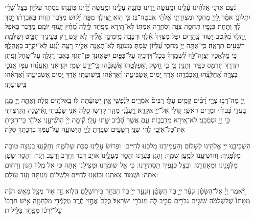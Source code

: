\documentclass[twoside, openany, parskip=half, 11pt]{book}
\begin{document}
נֹ֨עַם אֲדֹנָ֥י אֱלֹהֵ֗ינוּ עָ֫לֵ֥ינוּ וּמַֽעֲשֵׂ֣ה יָ֭דֵינוּ כּֽוֹנֲנָ֣ה עָלֵ֑ינוּ וּמַֽעֲשֵׂ֥ה יָ֝דֵ֗ינוּ כּֽוֹנֲנֵֽהוּ׃
 
 בְּסֵ֣תֶר עֶלְי֑וֹן בְּצֵ֥ל שַׁ֝דַּ֗י יִתְלוֹנָֽן׃
אֹמַ֗ר לַ֭יְיָ מַחְסִ֣י וּמְצֽוּדָתִ֑י אֱ֝לֹהַ֗י אֶבְטַח־בּֽוֹ׃ 
כִּ֤י ה֣וּא יַ֭צִּֽילְֿךָ מִפַּ֥ח יָ֝ק֗וּשׁ מִדֶּ֥בֶר הַוּֽוֹת׃ 
בְּאֶבְרָת֨וֹ יָ֣סֶךְ לָ֗ךְ וְתַ֣חַת כְּנָפָ֣יו תֶּחְסֶ֑ה צִנָּ֖ה וְסֹֽחֵרָ֣ה אֲמִתּֽוֹ׃ 
לֹֽא־תִ֭ירָא מִפַּ֣חַד לָ֑יְלָה מֵ֝חֵ֗ץ יָע֥וּף יוֹמָֽם׃ 
מִ֭דֶּֽבֶר בָּאֹ֣פֶל יַֽהֲלֹ֑ךְ מִ֝קֶּ֗טֶב יָשׁ֥וּד צָֽהֳרָֽיִם׃ 
יִפֹּ֤ל מִצִּדְּֿךָ֙ אֶ֗לֶף וּרְבָבָ֥ה מִֽימִינֶ֑ךָ אֵ֝לֶ֗יךָ לֹ֣א יִגָּֽשׁ׃ 
רַ֭ק בְּעֵינֶ֣יךָ תַבִּ֑יט וְשִׁלֻּמַ֖ת רְשָׁעִ֣ים תִּרְאֶֽה׃ 
כִּֽי־אַתָּ֣ה יְיָ֣ מַחְסִּ֑י עֶ֝לְי֗וֹן שַׂ֣מְתָּ מְעוֹנֶֽךָ׃ 
לֹֽא־תְאֻנֶּ֣ה אֵלֶ֣יךָ רָעָ֑ה וְנֶ֗֝גַע לֹֽא־יִקְרַ֥ב בְּאָֽהֳלֶֽךָ׃ 
כִּ֣י מַ֭לְאָכָיו יְצַוֶּה־לָּ֑ךְ לִ֝שְׁמָרְךָ֗ בְּכָל־דְּרָכֶֽיךָ׃ 
עַל־כַּפַּ֥יִם יִשָּׂא֑וּנְךָ פֶּן־תִּגֹּ֖ף בָּאֶ֣בֶן רַגְלֶֽךָ׃ 
עַל־שַׁ֣חַל וָפֶ֣תֶן תִּדְרֹ֑ךְ תִּרְמֹ֖ס כְּפִ֣יר וְתַנִּֽין׃ 
כִּ֤י בִ֣י חָ֭שַׁק וַֽאֲפַלְּֿטֵ֑הוּ אֲשַׂ֝גְּֿבֵ֗הוּ כִּֽי־יָדַ֥ע שְׁמִֽי׃ 
יִקְרָאֵ֨נִי וְֽאֶֽעֱנֵ֗הוּ עִמּ֣וֹ אָֽנֹכִ֣י בְצָרָ֑ה אֲ֝חַלְּֿצֵֽ֗הוּ וַֽאֲכַבְּֿדֵֽהוּ׃ 
אֹ֣רֶךְ יָ֭מִים ֖אַשְׂבִּיעֵ֑הוּ וְ֝אַרְאֵ֗הוּ בִּֽישֽׁוּעָתִֽי׃
אֹ֣רֶךְ יָ֭מִים ֖אַשְׂבִּיעֵ֑הוּ וְ֝אַרְאֵ֗הוּ בִּֽישֽׁוּעָתִֽי׃

 יְ֖יָ 
 מָה־רַבּ֣וּ צָרָ֑י רַ֝בִּ֗ים קָמִ֥ים עָלָֽי׃ רַבִּים֘ אֹֽמְֿרִ֢ים לְנַ֫פְשִׁ֥י אֵ֤ין יְשֽׁוּעָ֓תָה לּ֖וֹ בֵֽאלֹהִ֣ים סֶֽלָה׃ וְאַתָּ֣ה יְ֖יָ מָגֵ֥ן בַּֽעֲדִ֑י כְּ֝בוֹדִ֗י וּמֵרִ֥ים רֹאשִֽׁי׃ ק֭וֹלִֽי אֶל־יְיָ֣ אֶקְרָ֑א וַיַּֽעֲנֵ֙נִי מֵהַ֖ר קָדְשׁ֣וֹ סֶֽלָה׃ אֲנִ֥י שָׁכַ֗בְתִּי וָֽאִ֫ישָׁ֥נָה הֱקִיצ֑וֹתִי כִּ֖י יְיָ֣ יִסְמְֿכֵֽנִי׃ לֹֽא־אִ֭ירָא מֵרִֽבֲב֥וֹת עָ֑ם אֲשֶׁ֥ר סָ֝בִ֗יב שָׁ֣תוּ עָלָֽי׃ ק֘וּמָ֤ה יְיָ֨ הֽוֹשִׁ֘יעֵ֤נִי אֱלֹהַ֗י כִּֽי־הִכִּ֣יתָ אֶת־כָּל־אֹֽיְֿבַ֣י לֶ֑חִי שִׁנֵּ֖י רְשָׁעִ֣ים שִׁבַּֽרְתָּ׃ לַֽיְיָ֥ הַיְשׁוּעָ֑ה עַל־עַמְּֿךָ֖ בִרְכָתֶ֣ךָ סֶּֽלָה׃

	הַשְׁכִּיבֵֽנוּ יְיָ אֱלֹהֵֽינוּ לְשָׁלוֹם וְהַעֲמִידֵֽנוּ מַלְכֵּֽנוּ לְחַיִּים: וּפְרוֹשׂ עָלֵֽינוּ סֻכַּת שְׁלוֹמֶֽךָ: וְתַקְּֿנֵֽנוּ בְּעֵצָה טוֹבָה מִלְּֿפָנֶֽיךָ: וְהוֹשִׁיעֵֽנוּ לְמַֽעַן שְׁמֶֽךָ: וְהָגֵן בַּעֲדֵֽנוּ וְהָסֵר מֵעָלֵֽינוּ אוֹיֵב דֶּֽבֶר וְחֶֽרֶב וְרָעָב וְיָגוֹן: וְהָסֵר שָׂטָן מִלְּֿפָנֵֽינוּ וּמֵאַחֲרֵֽנוּ: וּבְצֵל כְּנָפֶֽיךָ תַּסְתִּירֵֽנוּ: כִּי אֵל שׁוֹמְֿרֵֽנוּ וּמַצִּילֵֽנוּ אַֽתָּה כִּי אֵל מֶֽלֶךְ חַנּוּן וְרַחוּם אַֽתָּה: וּשְׁמוֹר צֵאתֵֽנוּ וּבוֹאֵֽנוּ לְחַיִּים וּלְשָׁלוֹם מֵעַתָּה וְעַד עוֹלָם:


וַיֹּ֨אמֶר
 יְיָ֜ אֶל־הַשָּׂטָ֗ן יִגְעַ֨ר יְיָ֤ בְּךָ֙ הַשָּׂטָ֔ן וְיִגְעַ֤ר יְיָ֙ בְּךָ֔ הַבֹּחֵ֖ר בִּירֽוּשָׁלָ֑םִ הֲל֧וֹא זֶ֦ה א֖וּד מֻצָּ֥ל מֵאֵֽשׁ׃ 
הִנֵּ֗ה
 מִטָּתוֹ֙ שֶׁלִּשְׁלֹמֹ֔ה שִׁשִּׁ֥ים גִּבֹּרִ֖ים סָבִ֣יב לָ֑הּ מִגִּבֹּרֵ֖י יִשְׂרָאֵֽל׃ כֻּלָם֙ אֲחֻ֣זֵי חֶ֔רֶב מְלֻמְּֿדֵ֖י מִלְחָמָ֑ה אִ֤ישׁ חַרְבּוֹ֙ עַל־יְרֵכ֔וֹ מִפַּ֖חַד בַּלֵּילֽוֹת׃
\end{document}
